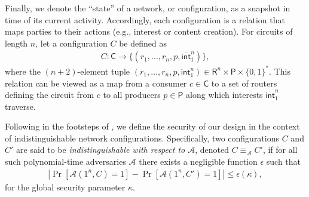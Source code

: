 Finally, we denote the ``state'' of a network, or configuration, as a snapshot in time of its current activity. Accordingly, each configuration is a relation that maps parties to their actions (e.g., interest or content creation). For circuits of length $n$, let a configuration $C$ be defined as
\begin{align*}
C : \mathsf{C} \to \{(r_1,\dots,r_n,p,\overline{\mathsf{int}}_1^n)\},
\end{align*}
where the $(n + 2)$-element tuple $(r_1,\dots,r_n,p,\mathsf{int}_1^n) \in \mathsf{R}^n \times \mathsf{P} \times \{0,1\}^*$. This relation can be viewed as a map from a consumer $c \in \mathsf{C}$ to a set of routers defining the circuit from $c$ to all producers $p \in \mathsf{P}$ along which interests $\overline{\mathsf{int}}_1^n$ traverse. 

Following in the footsteps of \cite{andana}, we define the security of our design in the context of indistinguishable network configurations. Specifically, two configurations $C$ and $C'$ are said to be \emph{indistinguishable with respect to $\mathcal{A}$}, denoted $C \equiv_{\mathcal{A}} C'$, if for all such polynomial-time adversaries $\mathcal{A}$ there exists a negligible function $\epsilon$ such that 
\begin{align*}
\left|\Pr[\mathcal{A}(1^n, C) = 1] - \Pr[\mathcal{A}(1^n, C') = 1]\right| \leq \epsilon(\kappa),
\end{align*}
for the global security parameter $\kappa$.


